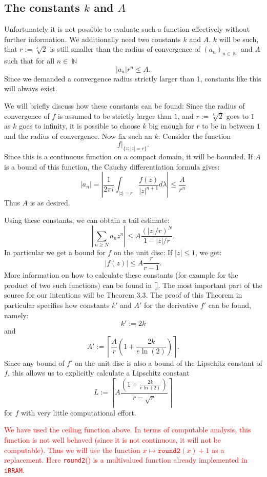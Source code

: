 \documentclass{article}
\DeclareMathOperator{\NN}{\ensuremath{\mathbb{N}}\xspace}
\newcommand{\irram}{\texttt{iRRAM}\xspace}
\newcommand{\ir}[1]{\texttt{#1}}
\newcommand{\temp}[1]{\textcolor{red}{#1}}
\begin{document}
\subsection[The constants k and A]{The constants $k$ and $A$}\label{sec: The constants k and A}

Unfortunately it is not possible to evaluate such a function effectively without further information. We additionally need two constants $k$ and $A$. $k$ will be such, that $r:=\sqrt[k]{2}$ is still smaller than the radius of convergence of $(a_n)_{n\in \NN}$ and $A$ such that for all $n\in \NN$
\[ |a_n|  r^n \leq A. \]
Since we demanded a convergence radius strictly larger than 1, constants like this will always exist.

We will briefly discuss how these constants can be found: Since the radius of convergence of $f$ is assumed to be strictly larger than $1$, and $r:=\sqrt[k] 2$ goes to $1$ as $k$ goes to infinity, it is possible to choose $k$ big enough for $r$ to be in between $1$ and the radius of convergence. Now fix such an $k$. Consider the function
\[ f|_{\{z:|z| = r\}}. \]
Since this is a continuous function on a compact domain, it will be bounded. If $A$ is a bound of this function, the Cauchy differentiation formula gives:
\[ |a_n |=  \left|\frac 1 {2\pi i}\int_{|z| = r} \frac{f(z)}{|z|^{n+1}} d\lambda\right| \leq \frac A {r^n} \]
Thus $A$ is as desired.

Using these constants, we can obtain a tail estimate:
\[ \left|\sum_{n \geq N} a_n z^n\right| \leq A \frac{(|z|/r)^N}{1- |z|/r}. \]
In particular we get a bound for $f$ on the unit disc: If $|z|\leq 1$, we get:
\[ |f(z)| \leq A\frac r{r-1}. \]
More information on how to calculate these constants (for example for the product of two such functions) can be found in \ref{}. The most important part of the source for our intentions will be Theorem 3.3. The proof of this Theorem in particular specifies how constants $k'$ and $A'$ for the derivative $f'$ can be found, namely:
\[ k' := 2 k \]
and
\[ A' := \left\lceil \frac{A}{r} \left(1+ \frac{2k}{e \ln(2)}\right)\right\rceil. \]
Since any bound of $f'$ on the unit disc is also a bound of the Lipschitz constant of $f$, this allows us to explicitly calculate a Lipschitz constant
\[ L := \left\lceil A \frac{\left(1 + \frac{2k}{e\ln(2)}\right)}{r-\sqrt{r}}\right\rceil \]
for $f$ with very little computational effort.

\temp{We have used the ceiling function above. In terms of computable analysis, this function is not well behaved (since it is not continuous, it will not be computable). Thus we will use the function $x \mapsto \ir{round2}(x) +1$ as a replacement. Here \ir{round2}() is a multivalued function already implemented in \irram.}
\end{document}
